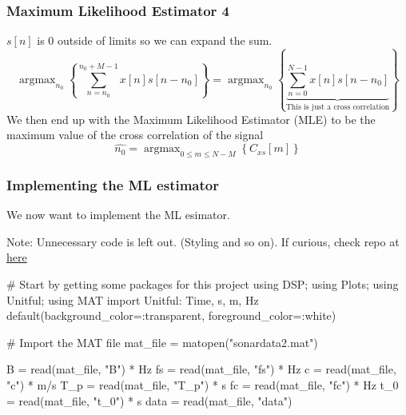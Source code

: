 \documentclass[compress]{beamer}
\DeclareMathOperator*{\argmax}{argmax}
\begin{document}
\begin{frame} %
  \frametitle{Maximum Likelihood Estimator 4}
    $s[n]$ is 0 outside of limits so we can expand the sum.
    \begin{equation*}
        \argmax_{n_0}
        \left\{
        \sum^{n_0+M-1}_{n=n_0}{x[n]s[n-n_0]}
        \right\} = 
        \argmax_{n_0}\left\{
            \underbrace{ \sum^{N-1}_{n=0}{x[n]s[n-n_0]} }_{
                \text{This is just a cross correlation}
            }
        \right\}
    \end{equation*}
    We then end up with the Maximum Likelihood Estimator (MLE) to be the
    maximum value of the cross correlation of the signal
    \begin{equation*}
    \widehat{n_0}=\argmax_{0\le m \le N-M}\left\{C_{xs}\left[m\right]\right\}
    \end{equation*}
\end{frame} %

\begin{frame}[fragile] %
    \frametitle{Implementing the ML estimator}
    We now want to implement the ML esimator.

    Note: Unnecessary code is left out. (Styling and so on). If curious,
    check repo at \href{https://github.com/Dainou01/Studies/tree/main/IN5340/Project2}{here}
    \begin{jllisting}[gobble=8]
        #  Start by getting some packages for this project
        using DSP; using Plots; using Unitful; using MAT
        import Unitful: Time, s, m, Hz
        default(background_color=:transparent, foreground_color=:white)

        # Import the MAT file 
        mat_file = matopen("sonardata2.mat")

        B    = read(mat_file, "B")    * Hz
        fs   = read(mat_file, "fs")   * Hz
        c    = read(mat_file, "c")    * m/s
        T_p  = read(mat_file, "T_p")  * s
        fc   = read(mat_file, "fc")   * Hz
        t_0  = read(mat_file, "t_0")  * s
        data = read(mat_file, "data")
    \end{jllisting}
\end{frame} 
\end{document}
